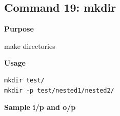 \subsection{Command 19: mkdir} 
\textbf{Purpose}
\begin{flushleft}
 make directories
\end{flushleft}
\textbf{Usage}
\begin{verbatim}
mkdir test/
mkdir -p test/nested1/nested2/
\end{verbatim}
\textbf{Sample i/p and o/p}
\begin{figure}[H] 
\end{figure}
